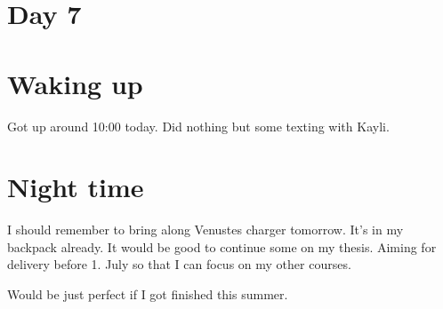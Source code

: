 \section{Day 7}
\section{Waking up}
Got up around 10:00 today.
Did nothing but some texting with Kayli.

\section{Night time}
I should remember to bring along Venustes charger tomorrow. It's in my backpack already.
It would be good to continue some on my thesis. Aiming for delivery before 1. July so that I can focus on my other courses.

Would be just perfect if I got finished this summer.